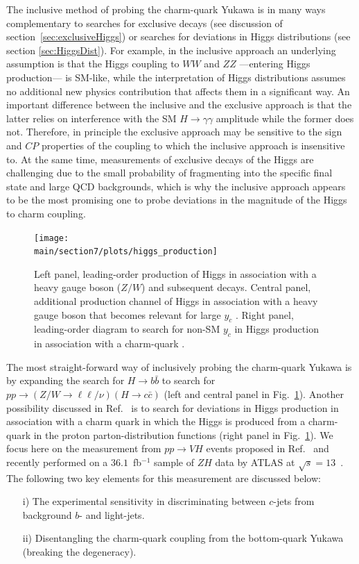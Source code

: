 \documentclass[../report.tex]{subfiles}
\providecommand{\main}{..}
\begin{document}
The inclusive method of probing the charm-quark Yukawa is in many ways complementary 
to searches for exclusive decays (see discussion of section~\ref{sec:exclusiveHiggs}) or 
searches for deviations in Higgs distributions (see section \ref{sec:HiggsDist}).
For example, in the inclusive approach an underlying assumption is 
that the Higgs coupling to $WW$ and $ZZ$ ---entering Higgs production--- is SM-like,
while the interpretation of Higgs distributions assumes no additional new physics contribution that affects them in a significant way.
An important difference between the inclusive and the exclusive approach is that the latter relies on interference with the SM $H\to \gamma\gamma$ amplitude while the former does not.
Therefore, in principle the exclusive approach may be sensitive to the sign and 
$CP$ properties of the coupling to which the inclusive approach is insensitive to.
At the same time, measurements of exclusive decays of the Higgs are challenging due 
to the small probability of fragmenting into the specific final state and 
large QCD backgrounds, which is why the inclusive approach appears to be the most promising one to probe deviations in the magnitude of the Higgs to charm coupling.

\begin{figure}[t]
	\centering
	\texttt{[image: \\main/section7/plots/higgs\_production]}
	\caption{Left panel, leading-order production of Higgs in association with a heavy gauge boson ($Z/W$) and 
		subsequent decays. Central panel, additional production channel of Higgs in association 
		with a heavy gauge boson that becomes relevant for large $y_c$ \cite{Perez:2015aoa}.
		Right panel, leading-order diagram to search for non-SM $y_c$ in Higgs production in 
		association with a charm-quark \cite{Brivio:2015fxa}.
	\label{fig:higgsproductionHcc}
	}
\end{figure}

The most straight-forward way of inclusively probing the charm-quark Yukawa is by 
expanding the search for $H\to b\bar b$ to search for 
$pp \to (Z/W\to\ell\ell/\nu) (H\to c\bar c)$ \cite{Perez:2015aoa}
(left and central panel in Fig.~\ref{fig:higgsproductionHcc}).
Another possibility discussed in Ref.~\cite{Brivio:2015fxa} is to search for deviations in Higgs production 
in association with a charm quark in which the Higgs is produced from a charm-quark in the proton 
parton-distribution functions (right panel in Fig.~\ref{fig:higgsproductionHcc}).
We focus here on the measurement from $pp\to VH$ events proposed in Ref.~\cite{Perez:2015aoa}
and recently performed on a $36.1$~fb$^{-1}$ sample of $ZH$ data by ATLAS \cite{Aaboud:2018fhh}
at $\sqrt{s}=13$~\UTeV.
The following two key elements for this measurement are discussed below:
\begin{itemize}
	\item[i)] The experimental sensitivity in discriminating between $c$-jets from
		background $b$- and light-jets.
	\item[ii)] Disentangling the charm-quark coupling from the 
		bottom-quark Yukawa (breaking the degeneracy).
\end{itemize}
\end{document}
